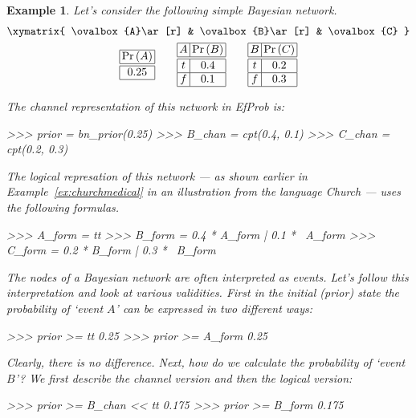 \documentclass[leqno]{tufte-book} %
\newtheorem{example}[theorem]{Example}
\newcommand{\EfProb}{\textit{EfProb}\xspace}
\newcommand{\Prob}[1]{\mathrm{Pr}\left({#1}\right)}
\begin{document}
\begin{example}
\label{ex:bayesianmodeling}
Let's consider the following simple Bayesian network.
\begin{gather*}
\xymatrix{
\ovalbox{A}\ar[r] & \ovalbox{B}\ar[r] & \ovalbox{C}
}
\\
{\setlength\tabcolsep{0.2em}\begin{tabular}{|c|}
\hline
$\Prob{A}$ \\
\hline\hline
$0.25$ \\
\hline
\end{tabular}}
\qquad
{\setlength\tabcolsep{0.2em}\begin{tabular}{|c|c|}
\hline
$A$ & $\Prob{B}$ \\
\hline\hline
$t$ & $0.4$ \\
\hline
$f$ & $0.1$ \\
\hline
\end{tabular}}
\qquad
{\setlength\tabcolsep{0.2em}\begin{tabular}{|c|c|}
\hline
$B$ & $\Prob{C}$ \\
\hline\hline
$t$ & $0.2$ \\
\hline
$f$ & $0.3$ \\
\hline
\end{tabular}}
\end{gather*}

\noindent The \emph{channel} representation of this network in \EfProb
is:
\begin{python}
>>> prior = bn_prior(0.25)
>>> B_chan = cpt(0.4, 0.1)
>>> C_chan = cpt(0.2, 0.3)
\end{python}

\noindent The \emph{logical} represation of this network --- as shown
earlier in Example~\ref{ex:churchmedical} in an illustration from the
language Church --- uses the following formulas.
\begin{python}
>>> A_form = tt
>>> B_form = 0.4 * A_form | 0.1 * ~A_form
>>> C_form = 0.2 * B_form | 0.3 * ~B_form
\end{python}

The nodes of a Bayesian network are often interpreted as events.
Let's follow this interpretation and look at various validities.
First in the initial (prior) state the probability of `event $A$' can
be expressed in two different ways:
\begin{python}
>>> prior >= tt
0.25
>>> prior >= A_form
0.25
\end{python}

\noindent Clearly, there is no difference. Next, how do we calculate
the probability of `event $B$'? We first describe the channel version
and then the logical version:
\begin{python}
>>> prior >= B_chan << tt
0.175
>>> prior >= B_form
0.175
\end{python}


\end{example}
\end{document}
